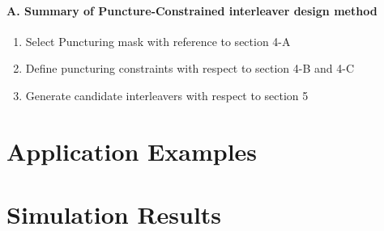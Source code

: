 \documentclass[fontsize=12pt]{article}
\begin{document}
\paragraph{A. Summary of Puncture-Constrained interleaver design method\newline}
\begin{enumerate}
\item Select Puncturing mask with reference to section 4-A

\item Define puncturing constraints with respect to section 4-B and 4-C

\item Generate candidate interleavers with respect to section 5
\end{enumerate}

\section{Application Examples}


\section{Simulation Results}
\end{document}
